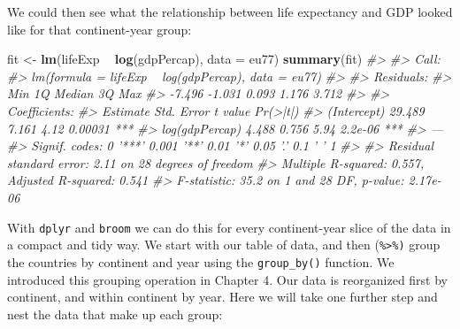 \documentclass[]{book}
\newenvironment{Shaded}{\begin{snugshade}}{\end{snugshade}}
\newcommand{\CommentTok}[1]{\textcolor[rgb]{0.56,0.35,0.01}{\textit{#1}}}
\newcommand{\DataTypeTok}[1]{\textcolor[rgb]{0.13,0.29,0.53}{#1}}
\newcommand{\DecValTok}[1]{\textcolor[rgb]{0.00,0.00,0.81}{#1}}
\newcommand{\KeywordTok}[1]{\textcolor[rgb]{0.13,0.29,0.53}{\textbf{#1}}}
\newcommand{\NormalTok}[1]{#1}
\newcommand{\OperatorTok}[1]{\textcolor[rgb]{0.81,0.36,0.00}{\textbf{#1}}}
\newcommand{\StringTok}[1]{\textcolor[rgb]{0.31,0.60,0.02}{#1}}
\begin{document}
\begin{Shaded}
\end{Shaded}

We could then see what the relationship between life expectancy and GDP looked like for that continent-year group:

\begin{Shaded}
\begin{Highlighting}[]
\NormalTok{fit <-}\StringTok{ }\KeywordTok{lm}\NormalTok{(lifeExp }\OperatorTok{~}\StringTok{ }\KeywordTok{log}\NormalTok{(gdpPercap), }\DataTypeTok{data =}\NormalTok{ eu77)}
\KeywordTok{summary}\NormalTok{(fit)}
\CommentTok{#> }
\CommentTok{#> Call:}
\CommentTok{#> lm(formula = lifeExp ~ log(gdpPercap), data = eu77)}
\CommentTok{#> }
\CommentTok{#> Residuals:}
\CommentTok{#>    Min     1Q Median     3Q    Max }
\CommentTok{#> -7.496 -1.031  0.093  1.176  3.712 }
\CommentTok{#> }
\CommentTok{#> Coefficients:}
\CommentTok{#>                Estimate Std. Error t value Pr(>|t|)    }
\CommentTok{#> (Intercept)      29.489      7.161    4.12  0.00031 ***}
\CommentTok{#> log(gdpPercap)    4.488      0.756    5.94  2.2e-06 ***}
\CommentTok{#> ---}
\CommentTok{#> Signif. codes:  0 '***' 0.001 '**' 0.01 '*' 0.05 '.' 0.1 ' ' 1}
\CommentTok{#> }
\CommentTok{#> Residual standard error: 2.11 on 28 degrees of freedom}
\CommentTok{#> Multiple R-squared:  0.557,  Adjusted R-squared:  0.541 }
\CommentTok{#> F-statistic: 35.2 on 1 and 28 DF,  p-value: 2.17e-06}
\end{Highlighting}
\end{Shaded}

With \texttt{dplyr} and \texttt{broom} we can do this for every continent-year slice of the data in a compact and tidy way. We start with our table of data, and then (\texttt{\%\textgreater{}\%)} group the countries by continent and year using the \texttt{group\_by()} function. We introduced this grouping operation in Chapter 4. Our data is reorganized first by continent, and within continent by year. Here we will take one further step and nest the data that make up each group:\\
\end{document}
